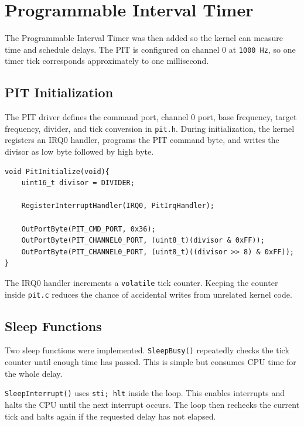 \section{Programmable Interval Timer}

The Programmable Interval Timer was then added so the kernel can measure time and schedule delays. The PIT is configured on channel 0 at \texttt{1000 Hz}, so one timer tick corresponds approximately to one millisecond.

\subsection{PIT Initialization}
The PIT driver defines the command port, channel 0 port, base frequency, target frequency, divider, and tick conversion in \texttt{pit.h}. During initialization, the kernel registers an IRQ0 handler, programs the PIT command byte, and writes the divisor as low byte followed by high byte.

\begin{listing}[H]
\begin{verbatim}
void PitInitialize(void){
    uint16_t divisor = DIVIDER;

    RegisterInterruptHandler(IRQ0, PitIrqHandler);

    OutPortByte(PIT_CMD_PORT, 0x36);
    OutPortByte(PIT_CHANNEL0_PORT, (uint8_t)(divisor & 0xFF));
    OutPortByte(PIT_CHANNEL0_PORT, (uint8_t)((divisor >> 8) & 0xFF));
}
\end{verbatim}
\caption{PIT channel 0 initialization and IRQ0 handler registration.}
\end{listing}

The IRQ0 handler increments a \texttt{volatile} tick counter. Keeping the counter inside \texttt{pit.c} reduces the chance of accidental writes from unrelated kernel code.

\subsection{Sleep Functions}
Two sleep functions were implemented. \texttt{SleepBusy()} repeatedly checks the tick counter until enough time has passed. This is simple but consumes CPU time for the whole delay.

\texttt{SleepInterrupt()} uses \texttt{sti; hlt} inside the loop. This enables interrupts and halts the CPU until the next interrupt occurs. The loop then rechecks the current tick and halts again if the requested delay has not elapsed.

